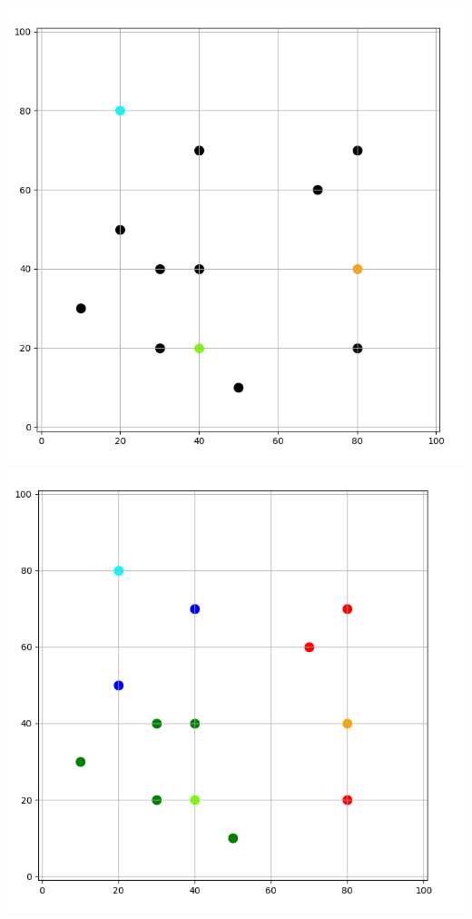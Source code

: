 \documentclass[11pt,class=report,crop=false]{standalone}
\begin{document}
\begin{activite}[Barycentres]
\begin{enumerate}
	\begin{center}
		\includegraphics[scale=\myscale,scale=0.173]{ecran-barycentres-7a}\quad
		\includegraphics[scale=\myscale,scale=0.18]{ecran-barycentres-7b}\quad

\end{center}
\end{enumerate}
\end{activite}
\end{document}
